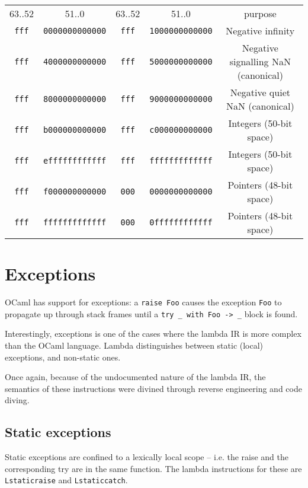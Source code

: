 \documentclass[12pt,a4paper,twoside,openright]{report}
\begin{document}
\begin{tabular}{c c | c c | c}
    63..52 & 51..0 & 63..52 & 51..0 & purpose \\
    \lstinline!fff! & \lstinline!0000000000000! & \lstinline!fff! & \lstinline!1000000000000! & Negative infinity \\
    \lstinline!fff! & \lstinline!4000000000000! & \lstinline!fff! & \lstinline!5000000000000! & Negative signalling NaN (canonical) \\
    \lstinline!fff! & \lstinline!8000000000000! & \lstinline!fff! & \lstinline!9000000000000! & Negative quiet NaN (canonical) \\
    \lstinline!fff! & \lstinline!b000000000000! & \lstinline!fff! & \lstinline!c000000000000! & Integers (50-bit space) \\
    \lstinline!fff! & \lstinline!effffffffffff! & \lstinline!fff! & \lstinline!fffffffffffff! & Integers (50-bit space) \\
    \lstinline!fff! & \lstinline!f000000000000! & \lstinline!000! & \lstinline!0000000000000! & Pointers (48-bit space) \\
    \lstinline!fff! & \lstinline!fffffffffffff! & \lstinline!000! & \lstinline!0ffffffffffff! & Pointers (48-bit space)
\end{tabular}

\section{Exceptions}\label{exceptions}

OCaml has support for exceptions: a \lstinline!raise Foo! causes the
exception \lstinline!Foo! to propagate up through stack frames until a
\lstinline!try _ with Foo -> _! block is found.

Interestingly, exceptions is one of the cases where the lambda IR is more
complex than the OCaml language. Lambda distinguishes between static (local)
exceptions, and non-static ones.

Once again, because of the undocumented nature of the lambda IR, the semantics
of these instructions were divined through reverse engineering and code diving.

\subsection{Static exceptions}

Static exceptions are confined to a lexically local scope -- i.e. the raise and
the corresponding try are in the same function. The lambda instructions for
these are \lstinline!Lstaticraise! and \lstinline!Lstaticcatch!.
\end{document}
